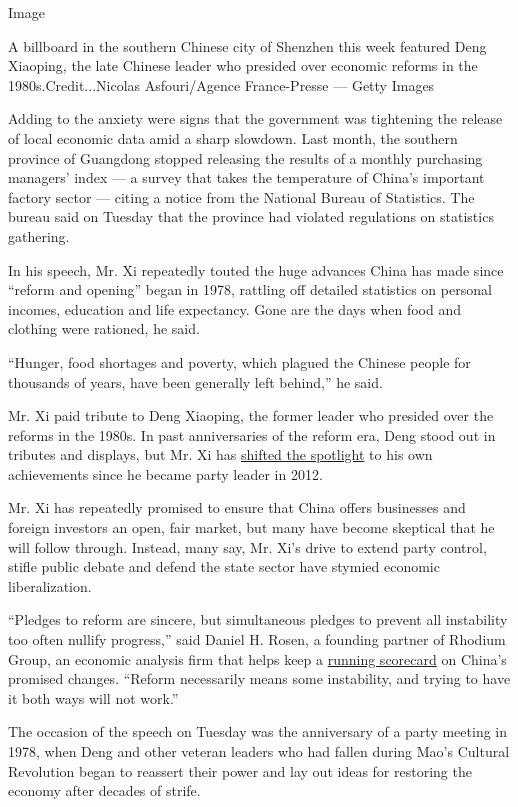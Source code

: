 Image

A billboard in the southern Chinese city of Shenzhen this week featured
Deng Xiaoping, the late Chinese leader who presided over economic
reforms in the 1980s.Credit...Nicolas Asfouri/Agence France-Presse ---
Getty Images

Adding to the anxiety were signs that the government was tightening the
release of local economic data amid a sharp slowdown. Last month, the
southern province of Guangdong stopped releasing the results of a
monthly purchasing managers' index --- a survey that takes the
temperature of China's important factory sector --- citing a notice from
the National Bureau of Statistics. The bureau said on Tuesday that the
province had violated regulations on statistics gathering.

In his speech, Mr. Xi repeatedly touted the huge advances China has made
since ``reform and opening'' began in 1978, rattling off detailed
statistics on personal incomes, education and life expectancy. Gone are
the days when food and clothing were rationed, he said.

``Hunger, food shortages and poverty, which plagued the Chinese people
for thousands of years, have been generally left behind,'' he said.

Mr. Xi paid tribute to Deng Xiaoping, the former leader who presided
over the reforms in the 1980s. In past anniversaries of the reform era,
Deng stood out in tributes and displays, but Mr. Xi has
\href{https://www.nytimes3xbfgragh.onion/2018/11/05/world/asia/china-xi-jinping-deng-xiaoping.html}{shifted
the spotlight} to his own achievements since he became party leader in
2012.

Mr. Xi has repeatedly promised to ensure that China offers businesses
and foreign investors an open, fair market, but many have become
skeptical that he will follow through. Instead, many say, Mr. Xi's drive
to extend party control, stifle public debate and defend the state
sector have stymied economic liberalization.

``Pledges to reform are sincere, but simultaneous pledges to prevent all
instability too often nullify progress,'' said Daniel H. Rosen, a
founding partner of Rhodium Group, an economic analysis firm that helps
keep a
\href{https://rhg.com/research/the-china-dashboard-tracking-chinas-economic-reforms/}{running
scorecard} on China's promised changes. ``Reform necessarily means some
instability, and trying to have it both ways will not work.''

The occasion of the speech on Tuesday was the anniversary of a party
meeting in 1978, when Deng and other veteran leaders who had fallen
during Mao's Cultural Revolution began to reassert their power and lay
out ideas for restoring the economy after decades of strife.

